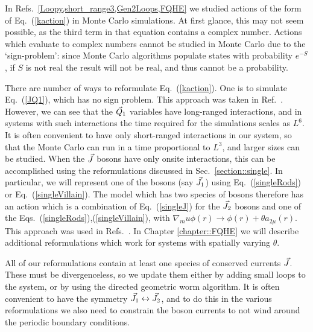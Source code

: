 In Refs.~\ref{Loopy,short_range3,Gen2Loops,FQHE} we studied actions of the form of Eq.~(\ref{kaction}) in Monte Carlo simulations. At first glance, this may not seem possible, as the third term in that equation contains a complex number. Actions which evaluate to complex numbers cannot be studied in Monte Carlo due to the `sign-problem': since Monte Carlo algorithms populate states with probability $e^{-S}$, if $S$ is not real the result will not be real, and thus cannot be a probability.

There are number of ways to reformulate Eq.~(\ref{kaction}). One is to simulate Eq.~(\ref{JQ1}), which has no sign problem. This approach was taken in Ref.~\cite{Gen2Loops}. However, we can see that the $\vec{Q}_1$ variables have long-ranged interactions, and in systems with such interactions the time required for the simulations scales as $L^6$. It is often convenient to have only short-ranged interactions in our system, so that the Monte Carlo can run in a time proportional to $L^3$, and larger sizes can be studied. 
When the $\vec{J}$ bosons have only onsite interactions, this can be accomplished using the reformulations discussed in Sec.~\ref{section::single}. In particular, we will represent one of the bosons (say $\vec{J}_1$) using Eq.~(\ref{singleRods}) or Eq.~(\ref{singleVillain}). The model which has two species of bosons therefore has an action which is a combination of Eq.~(\ref{singleJ}) for the $\vec{J}_2$ bosons and one of the Eqs.~(\ref{singleRods}),(\ref{singleVillain}), with $\nabla_mu\phi(r)\rightarrow\phi(r)+\theta a_{2\mu}(r)$. This approach was used in Refs.~\cite{Loopy,short_range3}. 
In Chapter \ref{chapter::FQHE} we will describe additional reformulations which work for systems with spatially varying $\theta$. 

All of our reformulations contain at least one species of conserved currents $\vec{J}$. These must be divergenceless, so we update them either by adding small loops to the system, or by using the directed geometric worm algorithm\cite{Sorensen}. It is often convenient to have the symmetry $\vec{J}_1\leftrightarrow\vec{J}_2$, and to do this in the various reformulations we also need to constrain the boson currents to not wind around the periodic boundary conditions.


